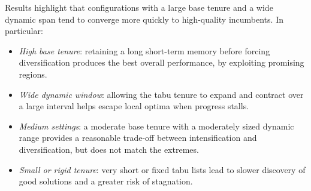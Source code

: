 \begin{table}[H]
  \centering
  \caption{Tabu search configurations}
  \label{tab:tabu-configs}
\end{table}

Results highlight that configurations with a large base tenure and a wide dynamic span tend to converge more quickly to high-quality incumbents. In particular:
\begin{itemize}
  \item \emph{High base tenure}: retaining a long short-term memory before forcing diversification produces the best overall performance, by exploiting promising regions.
  \item \emph{Wide dynamic window}: allowing the tabu tenure to expand and contract over a large interval helps escape local optima when progress stalls.
  \item \emph{Medium settings}: a moderate base tenure with a moderately sized dynamic range provides a reasonable trade-off between intensification and diversification, but does not match the extremes.
  \item \emph{Small or rigid tenure}: very short or fixed tabu lists lead to slower discovery of good solutions and a greater risk of stagnation.
\end{itemize}

